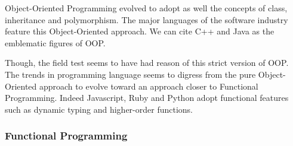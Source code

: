 
Object-Oriented Programming evolved to adopt as well the concepts of class, inheritance and polymorphism.
The major languages of the software industry feature this Object-Oriented approach.
We can cite C++ and Java as the emblematic figures of OOP.

Though, the field test seems to have had reason of this strict version of OOP.
The trends in programming language seems to digress from the pure Object-Oriented approach to evolve toward an approach closer to Functional Programming.
Indeed Javascript, Ruby and Python adopt functional features such as dynamic typing and higher-order functions.








\subsubsection{Functional Programming} \label{chapter3:software-design:programming-models:functional-programming}


